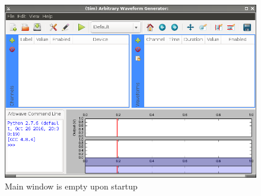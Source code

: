 \thispagestyle{fancy}
\pagestyle{fancy}


\begin{figure}[hb!]
  \centerline{\includegraphics[width=\textwidth]{figures/main-empty}}
  \caption{Main window is empty upon startup}
  \label{fig:quick:main-empty}
\end{figure}




